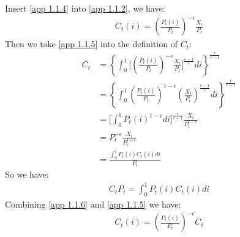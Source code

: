 \documentclass{article}
\numberwithin{equation}{section}
\begin{document}
Insert \eqref{app 1.1.4} into \eqref{app 1.1.2}, we have:
	\begin{align}
		C_t(i) = \left(\frac{P_t(i)}{P_t}\right)^{-\epsilon} \frac{X_t}{P_t} \label{app 1.1.5}
	\end{align}
Then we take \eqref{app 1.1.5} into the definition of $C_t$:
	\begin{align*}
		C_t &= \left\{\int^1_0 \bigg[\left(\frac{P_t(i)}{P_t}\right)^{-\epsilon} \frac{X_t}{P_t}\bigg]^{\frac{\epsilon-1}{\epsilon}}di\right\}^{\frac{\epsilon}{\epsilon-1}}\\
		&= \left\{\int^1_0 \left(\frac{P_t(i)}{P_t}\right)^{1-\epsilon} \left(\frac{X_t}{P_t}\right)^{\frac{\epsilon-1}{\epsilon}} di\right\}^{\frac{\epsilon}{\epsilon-1}}\\
		&= \bigg[\int^1_0 P_t(i)^{1-\epsilon}di\bigg]^{\frac{\epsilon}{\epsilon-1}} \frac{X_t}{P^{1-\epsilon}_t}\\
		&= P^{-\epsilon}_t \frac{X_t}{P^{1-\epsilon}_t}\\
		&= \frac{\int^1_0 P_t(i)C_t(i)di}{P_t}
	\end{align*}
So we have:
	\begin{align}
		C_t P_t = \int^1_0 P_t(i)C_t(i)di \label{app 1.1.6}
	\end{align}
Combining \eqref{app 1.1.6} and \eqref{app 1.1.5} we have:
	\begin{align}
		C_t(i) = \left(\frac{P_t(i)}{P_t}\right)^{-\epsilon} C_t \label{app 1.1.7}
	\end{align}
\end{document}
